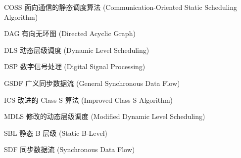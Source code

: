 

\begin{denotation}
  \item[COSS] 面向通信的静态调度算法 (Communication-Oriented Static Scheduling Algorithm)
  \item[DAG] 有向无环图 (Directed Acyclic Graph)
  \item[DLS] 动态层级调度 (Dynamic Level Scheduling)
  \item[DSP] 数字信号处理 (Digital Signal Processing)
  \item[GSDF] 广义同步数据流 (General Synchronous Data Flow)
  \item[ICS] 改进的 Class S 算法 (Improved Class S Algorithm)
  \item[MDLS] 修改的动态层级调度 (Modified Dynamic Level Scheduling)
  \item[SBL] 静态 B 层级 (Static B-Level)
  \item[SDF] 同步数据流 (Synchronous Data Flow)
\end{denotation}



%
